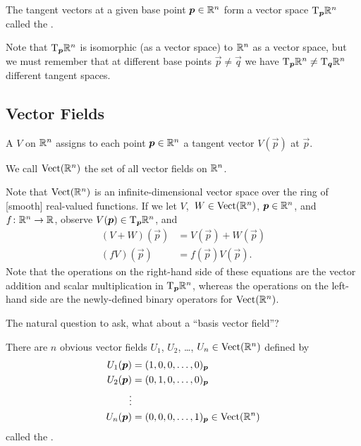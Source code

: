 \begin{definition}
The tangent vectors at a given base point $\boldsymbol{p}\in\mathbb{R}^{n}$ form a
vector space $\mathrm{T}_{\boldsymbol{p}}\mathbb{R}^{n}$ called the
.
\end{definition}

\begin{remark}
Note that $\mathrm{T}_{\boldsymbol{p}}\mathbb{R}^{n}$ is isomorphic (as a vector space) to
$\mathbb{R}^{n}$ as a vector space, but we must remember that at different base
points $\vec{p}\neq\vec{q}$ we have $\mathrm{T}_{\boldsymbol{p}}\mathbb{R}^{n}\neq\mathrm{T}_{\boldsymbol{q}}\mathbb{R}^{n}$
different tangent spaces.
\end{remark}

\subsection{Vector Fields}

\begin{definition}\label{defn:over-r-n:vector-field}
A  $V$ on $\mathbb{R}^{n}$ assigns to each point
$\boldsymbol{p}\in\mathbb{R}^{n}$ a tangent vector $V(\vec{p})$ at $\vec{p}$.

We call $\operatorname{Vect}(\mathbb{R}^{n})$ the set of all vector fields on $\mathbb{R}^{n}$.
\end{definition}

\label{chunk:over-r-n:structure-of-vect}
Note that $\operatorname{Vect}(\mathbb{R}^{n})$ is an infinite-dimensional vector space over
the ring of [smooth] real-valued functions. If we
let $V$,~$W\in\operatorname{Vect}(\mathbb{R}^{n})$, $\boldsymbol{p}\in\mathbb{R}^{n}$, and $f\colon\mathbb{R}^{n}\to\mathbb{R}$,
observe $V(\boldsymbol{p})\in\mathrm{T}_{\boldsymbol{p}}\mathbb{R}^{n}$, and
\begin{subequations}
  \begin{align}
    (V+W)(\vec{p}) &= V(\vec{p}) + W(\vec{p})\\
    (fV)(\vec{p}) &= f(\vec{p}) V(\vec{p}).
  \end{align}
\end{subequations}
Note that the operations on the right-hand side of these equations are
the vector addition and scalar multiplication in $\mathrm{T}_{\boldsymbol{p}}\mathbb{R}^{n}$,
whereas the operations on the left-hand side are the newly-defined
binary operators for $\operatorname{Vect}(\mathbb{R}^{n})$.

The natural question to ask, what about a ``basis vector field''?

\begin{definition}
There are $n$ obvious vector fields $U_{1}$, $U_{2}$, \dots, $U_{n}\in\operatorname{Vect}(\mathbb{R}^{n})$
defined by
\begin{equation}
\begin{split}
U_{1}(\boldsymbol{p}) &= (1,0,0,\dots,0)_{\boldsymbol{p}}\\
U_{2}(\boldsymbol{p}) &= (0,1,0,\dots,0)_{\boldsymbol{p}}\\
\vdots\\
U_{n}(\boldsymbol{p}) &= (0,0,0,\dots,1)_{\boldsymbol{p}}\in\operatorname{Vect}(\mathbb{R}^{n})
\end{split}
\end{equation}
called the .
\end{definition}

